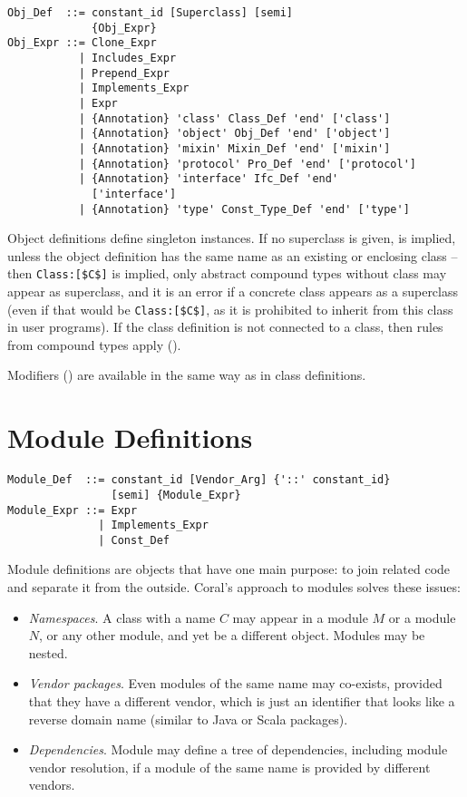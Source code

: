 \syntax\begin{lstlisting}
Obj_Def  ::= constant_id [Superclass] [semi]
             {Obj_Expr}
Obj_Expr ::= Clone_Expr
           | Includes_Expr
           | Prepend_Expr
           | Implements_Expr
           | Expr
           | {Annotation} 'class' Class_Def 'end' ['class']
           | {Annotation} 'object' Obj_Def 'end' ['object']
           | {Annotation} 'mixin' Mixin_Def 'end' ['mixin']
           | {Annotation} 'protocol' Pro_Def 'end' ['protocol']
           | {Annotation} 'interface' Ifc_Def 'end' 
             ['interface']
           | {Annotation} 'type' Const_Type_Def 'end' ['type']
\end{lstlisting}

Object definitions define singleton instances. If no superclass is given,  is implied, unless the object definition has the same name as an existing or enclosing class -- then \lstinline!Class:[$C$]! is implied, only abstract compound types without class may appear as superclass, and it is an error if a concrete class appears as a superclass (even if that would be \lstinline!Class:[$C$]!, as it is prohibited to inherit from this class in user programs). If the class definition is not connected to a class, then rules from compound types apply ().

Modifiers () are available in the same way as in class definitions. 

\section{Module Definitions}
\label{sec:module-definitions}

\syntax\begin{lstlisting}
Module_Def  ::= constant_id [Vendor_Arg] {'::' constant_id} 
                [semi] {Module_Expr}
Module_Expr ::= Expr
              | Implements_Expr
              | Const_Def
\end{lstlisting}

Module definitions are objects that have one main purpose: to join related code and separate it from the outside. Coral's approach to modules solves these issues: 
\begin{itemize}
\item {\em Namespaces}. A class with a name $C$ may appear in a module $M$ or a module $N$, or any other module, and yet be a different object. Modules may be nested.
\item {\em Vendor packages}. Even modules of the same name may co-exists, provided that they have a different vendor, which is just an identifier that looks like a reverse domain name (similar to Java or Scala packages). 
\item {\em Dependencies}. Module may define a tree of dependencies, including module vendor resolution, if a module of the same name is provided by different vendors. 
\end{itemize}

